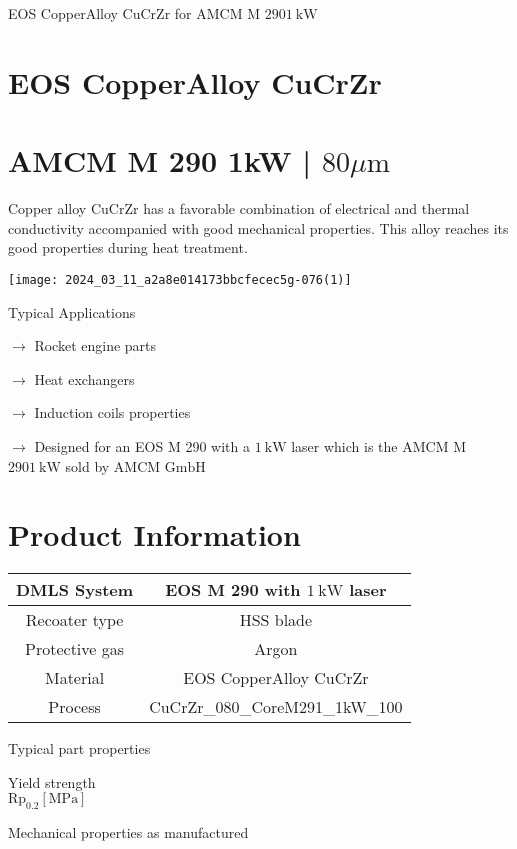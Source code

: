 \documentclass[10pt]{article}
\begin{document}
EOS CopperAlloy CuCrZr for AMCM M $2901 \mathrm{~kW}$

\section*{EOS CopperAlloy CuCrZr}
\section*{AMCM M 290 1kW | $80 \mu \mathrm{m}$}
Copper alloy $\mathrm{CuCrZr}$ has a favorable combination of electrical and thermal conductivity accompanied with good mechanical properties. This alloy reaches its good properties during heat treatment.

\begin{center}
\texttt{[image: 2024\_03\_11\_a2a8e014173bbcfecec5g-076(1)]}
\end{center}

Typical Applications

$\longrightarrow$ Rocket engine parts

$\longrightarrow$ Heat exchangers

$\longrightarrow$ Induction coils properties

$\longrightarrow$ Designed for an EOS M 290 with a $1 \mathrm{~kW}$ laser which is the AMCM M $2901 \mathrm{~kW}$ sold by AMCM $\mathrm{GmbH}$

\section*{Product Information}
\begin{center}
\begin{tabular}{|c|c|}
\hline
DMLS System & EOS M 290 with $1 \mathrm{~kW}$ laser \\
\hline
Recoater type & HSS blade \\
\hline
Protective gas & Argon \\
\hline
Material & EOS CopperAlloy CuCrZr \\
\hline
Process & CuCrZr\_080\_CoreM291\_1kW\_100 \\
\hline
\end{tabular}
\end{center}

Typical part properties

Yield strength\\
$\mathrm{Rp}_{0.2}[\mathrm{MPa}]$

Mechanical properties as manufactured
\end{document}
